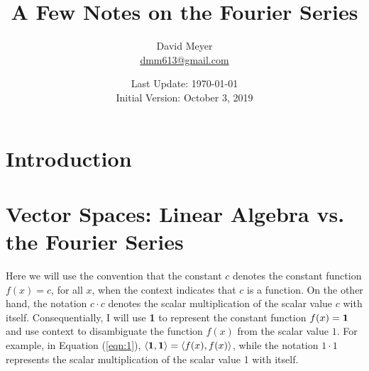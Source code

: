 \documentclass{article}
\title{A Few Notes on the Fourier Series}
\author{David Meyer \\ \href{mailto:dmm613@gmail.com}
                            {dmm613@gmail.com}}
\date{Last Update: \today \\
	 {\vspace{1.00mm} \small Initial Version: October 3, 2019}}
\theoremstyle{definition}
\begin{document}
\maketitle
%
%
%
\section{Introduction}
\label{sec:introduction}

\section{Vector Spaces: Linear Algebra vs. the Fourier Series}
\label{section:vector_spaces}
Here we will use the convention that the constant $c$ denotes 
the constant function $f(x) = c$, for all $x$, when the context 
indicates that $c$ is a function. On the other hand, the notation
$c \cdot c$ denotes the scalar multiplication of the scalar value 
$c$ with itself. Consequentially, I will use {\bf 1} to represent 
the constant function $f(x) = {\bf 1}$ and use context to disambiguate 
the function $f(x)$ from the scalar value $1$. For example, in 
Equation (\ref{eqn:1}), $\langle {\bf 1},{\bf 1} \rangle = \langle 
f(x),f(x) \rangle$, while the notation $1 \cdot 1$ represents the scalar 
multiplication of the scalar value 1 with itself.

\setlength{\tabcolsep}{15pt}
\renewcommand{\arraystretch}{3.00}
\end{document}
